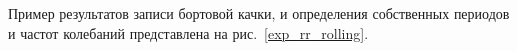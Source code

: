 Пример результатов записи бортовой качки, и определения собственных периодов и частот колебаний представлена на рис.~\ref{exp_rr_rolling}.





